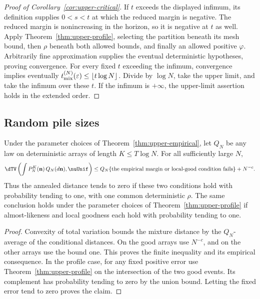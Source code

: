 
\begin{proof}[Proof of Corollary~\ref{cor:upper-critical}]
If $t$ exceeds the displayed infimum, its definition supplies $0<s<t$ at which
the reduced margin is negative. The reduced margin is nonincreasing
in the horizon, so it is negative at $t$ as well. Apply
Theorem~\ref{thm:upper-profile}, selecting the partition beneath its
mesh bound, then $\rho$ beneath both allowed bounds, and finally an
allowed positive $\varphi$. Arbitrarily fine approximation supplies
the eventual deterministic hypotheses, proving convergence.
For every fixed $t$ exceeding the infimum, convergence implies eventually
$t_{\rm mix}^{(N)}(\varepsilon)\le\lfloor t\log N\rfloor$.
Divide by $\log N$, take the upper limit, and take the infimum over
these $t$. If the infimum is $+\infty$, the upper-limit assertion
holds in the extended order.
\end{proof}

\subsection{Random pile sizes}
\begin{corollary}\label{cor:upper-random}
Under the parameter choices of Theorem~\ref{thm:upper-empirical}, let
$Q_N$ be any law on deterministic arrays of length $K\le T\log N$.
For all sufficiently large $N$,
\[
 \dTV\left(\int P_N^K(\mathbf n)\,Q_N(d\mathbf n),
                         \nuUnif\right)
 \le Q_N\{\text{the empirical margin or local-good condition fails}\}
                        +N^{-c}.
\]
Thus the annealed distance tends to zero if these two conditions hold
with probability tending to one, with one common deterministic $\rho$.
The same conclusion holds under the parameter choices of
Theorem~\ref{thm:upper-profile} if almost-likeness and local goodness
each hold with probability tending to one.
\end{corollary}
\begin{proof}
Convexity of total variation bounds the mixture distance by the
$Q_N$-average of the conditional distances. On the good arrays use
$N^{-c}$, and on the other arrays use the bound one. This proves the
finite inequality and its empirical consequence. In the profile
case, for any fixed positive error use
Theorem~\ref{thm:upper-profile} on the intersection of the two good
events. Its complement has probability tending to zero by the union
bound. Letting the fixed error tend to zero proves the claim.
\end{proof}


